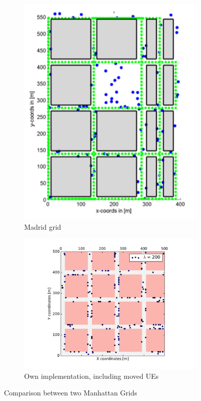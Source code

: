 \begin{figure}
\centering
\begin{subfigure}{.35\textwidth}
  \centering
  \includegraphics[width=1.2\linewidth]{figures/Madrid}
  \caption{Madrid grid \cite{Raschkowski}}
  \label{fig:Madrid}
\end{subfigure}%
\begin{subfigure}{.65\textwidth}
  \centering
  \includegraphics[width=1.058\linewidth]{figures/mh_grid}
  \caption{Own implementation, including moved UEs}
  \label{fig:mh_grid_own}
\end{subfigure}
\caption{Comparison between two Manhattan Grids}
\label{fig:mh_grid}
\end{figure}


